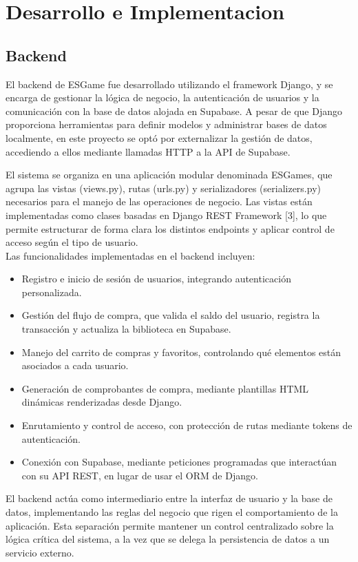 \documentclass[conference]{IEEEtran}
\begin{document}
\section{Desarrollo e Implementacion}

\subsection{Backend}

El backend de ESGame fue desarrollado utilizando el framework Django, y se encarga de gestionar la lógica de negocio, la autenticación de usuarios y la comunicación con la base de datos alojada en Supabase. A pesar de que Django proporciona herramientas para definir modelos y administrar bases de datos localmente, en este proyecto se optó por externalizar la gestión de datos, accediendo a ellos mediante llamadas HTTP a la API de Supabase.

El sistema se organiza en una aplicación modular denominada ESGames, que agrupa las vistas (views.py), rutas (urls.py) y serializadores (serializers.py) necesarios para el manejo de las operaciones de negocio. Las vistas están implementadas como clases basadas en Django REST Framework [3], lo que permite estructurar de forma clara los distintos endpoints y aplicar control de acceso según el tipo de usuario.\\

Las funcionalidades implementadas en el backend incluyen:
\begin{itemize}
	\item Registro e inicio de sesión de usuarios, integrando autenticación personalizada.
	\item Gestión del flujo de compra, que valida el saldo del usuario, registra la transacción y actualiza la biblioteca en Supabase.
	\item Manejo del carrito de compras y favoritos, controlando qué elementos están asociados a cada usuario.
	\item Generación de comprobantes de compra, mediante plantillas HTML dinámicas renderizadas desde Django.
	\item Enrutamiento y control de acceso, con protección de rutas mediante tokens de autenticación.
	\item Conexión con Supabase, mediante peticiones programadas que interactúan con su API REST, en lugar de usar el ORM de Django.
\end{itemize}

El backend actúa como intermediario entre la interfaz de usuario y la base de datos, implementando las reglas del negocio que rigen el comportamiento de la aplicación. Esta separación permite mantener un control centralizado sobre la lógica crítica del sistema, a la vez que se delega la persistencia de datos a un servicio externo.
\end{document}
